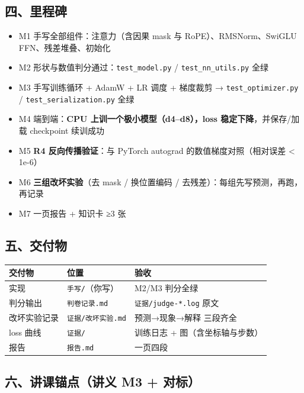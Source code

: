 \documentclass[
  chinese,
  11pt,
]{ctexart}
\newcounter{none} %
\providecommand{\tightlist}{%
  \setlength{\itemsep}{0pt}\setlength{\parskip}{0pt}}
\begin{document}
\subsection{四、里程碑}\label{ux56dbux91ccux7a0bux7891}

\begin{itemize}
\tightlist
\item[$\square$]
  M1 手写全部组件：注意力（含因果 mask 与 RoPE）、RMSNorm、SwiGLU FFN、残差堆叠、初始化
\item[$\square$]
  M2 形状与数值判分通过：\texttt{test\_model.py} / \texttt{test\_nn\_utils.py} 全绿
\item[$\square$]
  M3 手写训练循环 + AdamW + LR 调度 + 梯度裁剪 → \texttt{test\_optimizer.py} / \texttt{test\_serialization.py} 全绿
\item[$\square$]
  M4 端到端：\textbf{CPU 上训一个极小模型（d4--d8），loss 稳定下降}，并保存/加载 checkpoint 续训成功
\item[$\square$]
  M5 \textbf{R4 反向传播验证}：与 PyTorch autograd 的数值梯度对照（相对误差 \textless{} 1e-6）
\item[$\square$]
  M6 \textbf{三组改坏实验}（去 mask / 换位置编码 / 去残差）：每组先写预测，再跑，再记录
\item[$\square$]
  M7 一页报告 + 知识卡 ≥3 张
\end{itemize}

\subsection{五、交付物}\label{ux4e94ux4ea4ux4ed8ux7269}

{\def\LTcaptype{none} %
\begin{longtable}[]{@{}lll@{}}
\toprule\noalign{}
交付物 & 位置 & 验收 \\
\midrule\noalign{}
\endhead
\bottomrule\noalign{}
\endlastfoot
实现 & \texttt{手写/}（你写） & M2/M3 判分全绿 \\
判分输出 & \texttt{判卷记录.md} & \texttt{证据/judge-*.log} 原文 \\
改坏实验记录 & \texttt{证据/改坏实验.md} & 预测→现象→解释 三段齐全 \\
loss 曲线 & \texttt{证据/} & 训练日志 + 图（含坐标轴与步数） \\
报告 & \texttt{报告.md} & 一页四段 \\
\end{longtable}
}

\subsection{六、讲课锚点（讲义 M3 + 对标）}\label{ux516dux8bb2ux8bfeux951aux70b9ux8bb2ux4e49-m3-ux5bf9ux6807}
\end{document}
